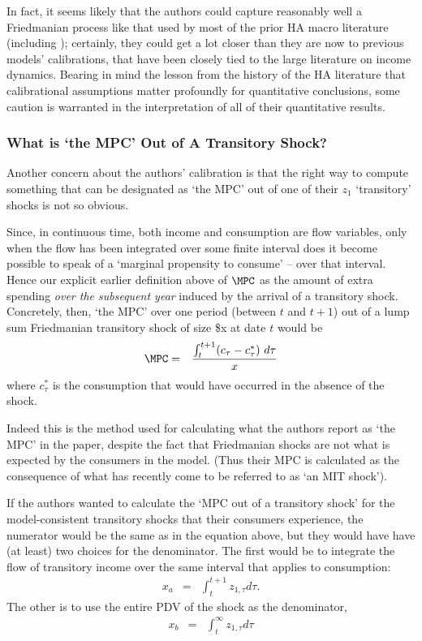 \documentclass[titlepage]{econtex}
\begin{document}
In fact, it seems likely that the authors could capture reasonably well a Friedmanian process like that used by most of the prior HA macro literature (including \cite{kaplanInequality}); certainly, they could get a lot closer than they are now to previous models' calibrations, that have been closely tied to the large literature on income dynamics.  Bearing in mind the lesson from the history of the HA literature that calibrational assumptions matter profoundly for quantitative conclusions, some caution is warranted in the interpretation of all of their quantitative results.

\subsubsection{What is `the MPC' Out of A Transitory Shock?}

Another concern about the authors' calibration is that the right way to compute something that can be designated as `the MPC' out of one of their $z_{1}$ `transitory' shocks is not so obvious.

Since, in continuous time, both income and consumption are flow variables, only when the flow has been integrated over some finite interval does it become possible to speak of a `marginal propensity to consume' -- over that interval.  Hence our explicit earlier definition above of $\MPC$ as the amount of extra spending {\it over the subsequent year} induced by the arrival of a transitory shock.  Concretely, then, `the MPC' over one period (between $t$ and $t+1$) out of a lump sum Friedmanian transitory shock of size \$x at date $t$ would be
\begin{eqnarray}
  \MPC & = & \frac{\int_{t}^{t+1} (c_{\tau}-c^{*}_\tau)~ d\tau}{x}
\end{eqnarray}
where $c^{*}_\tau$ is the consumption that would have occurred in the absence of the shock.

Indeed this is the method used for calculating what the authors report as `the MPC' in the paper, despite the fact that Friedmanian shocks are not what is expected by the consumers in the model.  (Thus their MPC is calculated as the consequence of what has recently come to be referred to as `an MIT shock').  

If the authors wanted to calculate the `MPC out of a transitory shock' for the model-consistent transitory shocks that their consumers experience, the numerator would be the same as in the equation above, but they would have have (at least) two choices for the denominator.  The first would be to integrate the flow of transitory income over the same interval that applies to consumption:
\begin{eqnarray}
  x_{a} & = & \int_{t}^{t+1} z_{1,\tau} d \tau.
\end{eqnarray}
The other is to use the entire PDV of the shock as the denominator,
\begin{eqnarray}
  x_{b} & =& \int_{t}^{\infty} z_{1,\tau} d\tau
\end{eqnarray}
\end{document}
